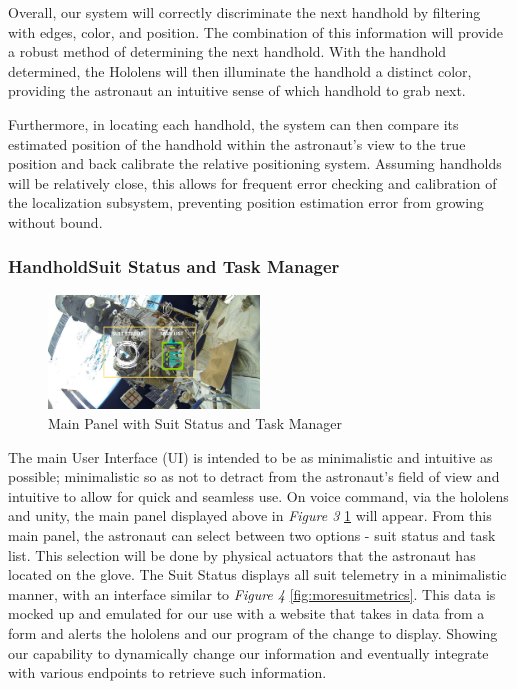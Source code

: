 \documentclass{article}
\let\Oldsubsubsection\subsubsection
\renewcommand{\subsubsection}{\FloatBarrier\Oldsubsubsection}
\begin{document}
Overall, our system will correctly discriminate the next handhold by filtering with edges, color, and position. The combination of this information will provide a robust method of determining the next handhold. With the handhold determined, the Hololens will then illuminate the handhold a distinct color, providing the astronaut an intuitive sense of which handhold to grab next.

Furthermore, in locating each handhold, the system can then compare its estimated position of the handhold within the astronaut’s view to the true position and back calibrate the relative positioning system. Assuming handholds will be relatively close, this allows for frequent error checking and calibration of the localization subsystem, preventing position estimation error from growing without bound.

\subsubsection{HandholdSuit Status and Task Manager}

\begin{figure}[!htb]
  \centering
  \includegraphics[width=0.5\textwidth]{assets/suitdatatasklist.png}
  \caption{Main Panel with Suit Status and Task Manager}
  \label{fig:suitdatatasklist}
\end{figure}

The main User Interface (UI) is intended to be as minimalistic and intuitive as possible; minimalistic so as not to detract from the astronaut’s field of view and intuitive to allow for quick and seamless use. On voice command, via the hololens and unity, the main panel displayed above in \textit{Figure 3} \ref{fig:suitdatatasklist} will appear. From this main panel, the astronaut can select between two options - suit status and task list. This selection will be done by physical actuators that the astronaut has located on the glove. The Suit Status displays all suit telemetry in a minimalistic manner, with an interface similar to \textit{Figure 4} \ref{fig:moresuitmetrics}. This data is mocked up and emulated for our use with a website that takes in data from a form and alerts the hololens and our program of the change to display. Showing our capability to dynamically change our information and eventually integrate with various endpoints to retrieve such information.
\end{document}
